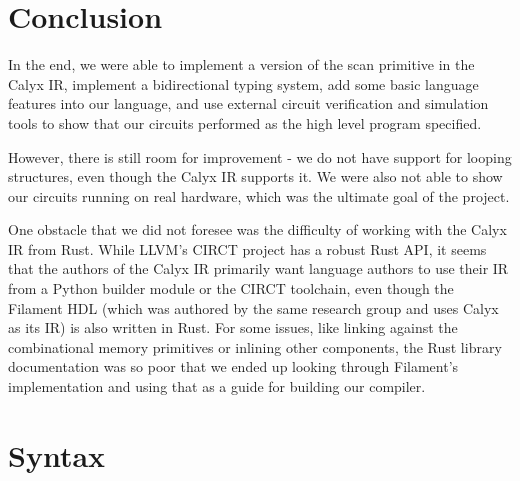 \documentclass[12pt]{article}
\begin{document}
\section{Conclusion}
In the end, we were able to implement a version of the scan primitive in the Calyx IR, implement a bidirectional
typing system, add some basic language features into our language, and use external circuit verification and simulation
tools to show that our circuits performed as the high level program specified.

However, there is still room for improvement - we do not have support for looping structures, even though the Calyx IR supports
it. We were also not able to show our circuits running on real hardware, which was the ultimate goal of the project.

One obstacle that we did not foresee was the difficulty of working with the Calyx IR from Rust. While LLVM's CIRCT project
has a robust Rust API, it seems that the authors of the Calyx IR primarily want language authors to use their IR from
a Python builder module or the CIRCT toolchain, even though the Filament HDL (which was authored by the same research
group and uses Calyx as its IR) is also written in Rust. For some issues, like linking against the combinational memory
primitives or inlining other components, the Rust library documentation was so poor that we ended up looking through
Filament's implementation and using that as a guide for building our compiler.

\section{Syntax}
\setlength{\grammarparsep}{20pt plus 1pt minus 1pt}
\setlength{\grammarindent}{12em}
\end{document}
